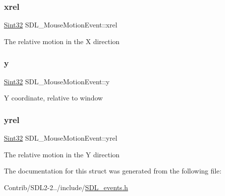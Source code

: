 \subsubsection{\texorpdfstring{xrel}{xrel}}
{\footnotesize\ttfamily \mbox{\hyperlink{_s_d_l__stdinc_8h_a7a90b941db9d4582e9ad7abb9940ff7e}{Sint32}} S\+D\+L\+\_\+\+Mouse\+Motion\+Event\+::xrel}

The relative motion in the X direction \mbox{\label{struct_s_d_l___mouse_motion_event_a7e6a7b1f8713d1968dc913908e8ea448}} 
\subsubsection{\texorpdfstring{y}{y}}
{\footnotesize\ttfamily \mbox{\hyperlink{_s_d_l__stdinc_8h_a7a90b941db9d4582e9ad7abb9940ff7e}{Sint32}} S\+D\+L\+\_\+\+Mouse\+Motion\+Event\+::y}

Y coordinate, relative to window \mbox{\label{struct_s_d_l___mouse_motion_event_a7674c8b92d039ab948f671a180fa7b30}} 
\subsubsection{\texorpdfstring{yrel}{yrel}}
{\footnotesize\ttfamily \mbox{\hyperlink{_s_d_l__stdinc_8h_a7a90b941db9d4582e9ad7abb9940ff7e}{Sint32}} S\+D\+L\+\_\+\+Mouse\+Motion\+Event\+::yrel}

The relative motion in the Y direction 

The documentation for this struct was generated from the following file\+:\begin{DoxyCompactItemize}
\item 
Contrib/\+S\+D\+L2-\/2../include/\mbox{\hyperlink{_s_d_l__events_8h}{S\+D\+L\+\_\+events.\+h}}\end{DoxyCompactItemize}
